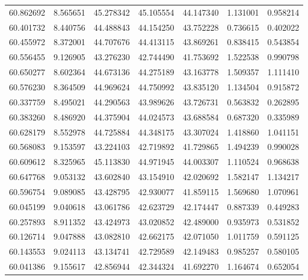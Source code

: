 \begin{tabular}{rrrrrrr}
 60.862692 &   8.565651 &         45.278342 &         45.105554 &         44.147340 &  1.131001 &  0.958214 \\
 60.401732 &   8.440756 &         44.488843 &         44.154250 &         43.752228 &  0.736615 &  0.402022 \\
 60.455972 &   8.372001 &         44.707676 &         44.413115 &         43.869261 &  0.838415 &  0.543854 \\
 60.556455 &   9.126905 &         43.276230 &         42.744490 &         41.753692 &  1.522538 &  0.990798 \\
 60.650277 &   8.602364 &         44.673136 &         44.275189 &         43.163778 &  1.509357 &  1.111410 \\
 60.576230 &   8.364509 &         44.969624 &         44.750992 &         43.835120 &  1.134504 &  0.915872 \\
 60.337759 &   8.495021 &         44.290563 &         43.989626 &         43.726731 &  0.563832 &  0.262895 \\
 60.383260 &   8.486920 &         44.375904 &         44.024573 &         43.688584 &  0.687320 &  0.335989 \\
 60.628179 &   8.552978 &         44.725884 &         44.348175 &         43.307024 &  1.418860 &  1.041151 \\
 60.568083 &   9.153597 &         43.224103 &         42.719892 &         41.729865 &  1.494239 &  0.990028 \\
 60.609612 &   8.325965 &         45.113830 &         44.971945 &         44.003307 &  1.110524 &  0.968638 \\
 60.647768 &   9.053132 &         43.602840 &         43.154910 &         42.020692 &  1.582147 &  1.134217 \\
 60.596754 &   9.089085 &         43.428795 &         42.930077 &         41.859115 &  1.569680 &  1.070961 \\
 60.045199 &   9.040618 &         43.061786 &         42.623729 &         42.174447 &  0.887339 &  0.449283 \\
 60.257893 &   8.911352 &         43.424973 &         43.020852 &         42.489000 &  0.935973 &  0.531852 \\
 60.126714 &   9.047888 &         43.082810 &         42.662175 &         42.071050 &  1.011759 &  0.591125 \\
 60.143553 &   9.024113 &         43.134741 &         42.729589 &         42.149483 &  0.985257 &  0.580105 \\
 60.041386 &   9.155617 &         42.856944 &         42.344324 &         41.692270 &  1.164674 &  0.652054 \\

\end{tabular}
